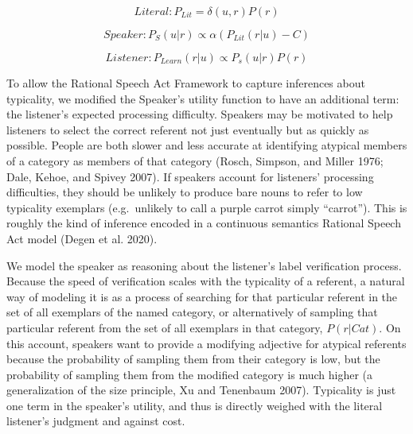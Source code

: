 \documentclass{ucetd}
\begin{document}
\[Literal: P_{Lit} = \delta\left(u,r\right)P\left(r\right)\]

\[Speaker: P_S\left(u \vert r\right) \propto \alpha \left(P_{Lit}\left(r \vert u\right) - C\right)\]

\[Listener: P_{Learn}\left(r \vert u\right) \propto P_s\left(u \vert r\right)P\left(r\right)\]

To allow the Rational Speech Act Framework to capture inferences about
typicality, we modified the Speaker's utility function to have an
additional term: the listener's expected processing difficulty. Speakers
may be motivated to help listeners to select the correct referent not
just eventually but as quickly as possible. People are both slower and
less accurate at identifying atypical members of a category as members
of that category (Rosch, Simpson, and Miller 1976; Dale, Kehoe, and
Spivey 2007). If speakers account for listeners' processing
difficulties, they should be unlikely to produce bare nouns to refer to
low typicality exemplars (e.g.~unlikely to call a purple carrot simply
``carrot''). This is roughly the kind of inference encoded in a
continuous semantics Rational Speech Act model (Degen et al. 2020).

We model the speaker as reasoning about the listener's label
verification process. Because the speed of verification scales with the
typicality of a referent, a natural way of modeling it is as a process
of searching for that particular referent in the set of all exemplars of
the named category, or alternatively of sampling that particular
referent from the set of all exemplars in that category,
\(P\left(r \vert Cat\right)\). On this account, speakers want to provide
a modifying adjective for atypical referents because the probability of
sampling them from their category is low, but the probability of
sampling them from the modified category is much higher (a
generalization of the size principle, Xu and Tenenbaum 2007). Typicality
is just one term in the speaker's utility, and thus is directly weighed
with the literal listener's judgment and against cost.
\end{document}

